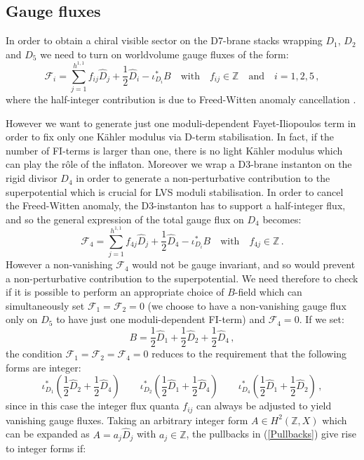 \documentclass[11pt,a4paper]{article}
\newcommand{\be}{\begin{equation}}
\newcommand{\ee}{\end{equation}}
\newcommand{\F}{\mathcal{F}}
\begin{document}
\subsection{Gauge fluxes}

In order to obtain a chiral visible sector on the D7-brane stacks wrapping $D_1$, $D_2$ and $D_5$ we need to turn on worldvolume gauge fluxes of the form:
\be
\F_i = \sum_{j=1}^{h^{1,1}} f_{ij}\hat{D}_j + \frac12 \hat{D}_i - \iota_{D_i}^*B \quad\text{with}\quad f_{ij}\in \mathbb{Z} \quad\text{and}\quad i=1,2,5\,,
\ee
where the half-integer contribution is due to Freed-Witten anomaly cancellation \cite{Minasian:1997mm, Freed:1999vc}. 

However we want to generate just one moduli-dependent Fayet-Iliopoulos term in order to fix only one K\"ahler modulus via D-term stabilisation. In fact, if the number of FI-terms is larger than one, there is no light K\"ahler modulus which can play the r\^ole of the inflaton. Moreover we wrap a D3-brane instanton on the rigid divisor $D_4$ in order to generate a non-perturbative contribution to the superpotential which is crucial for LVS moduli stabilisation. In order to cancel the Freed-Witten anomaly, the D3-instanton has to support a half-integer flux, and so the general expression of the total gauge flux on $D_4$ becomes:
\be
\F_4 = \sum_{j=1}^{h^{1,1}} f_{4j}\hat{D}_j + \frac12 \hat{D}_4 - \iota_{D_i}^*B \quad\text{with}\quad f_{4j}\in \mathbb{Z}\,.
\ee
However a non-vanishing $\F_4$ would not be gauge invariant, and so would prevent a non-perturbative contribution to the superpotential. We need therefore to check if it is possible to perform an appropriate choice of $B$-field which can simultaneously set $\F_1=\F_2=0$ (we choose to have a non-vanishing gauge flux only on $D_5$ to have just one moduli-dependent FI-term) and $\F_4=0$. If we set:
\be
B = \frac12 \hat{D}_1 + \frac12 \hat{D}_2 + \frac12 \hat{D}_4\,,
\label{Bfield}
\ee
the condition $\F_1=\F_2=\F_4=0$ reduces to the requirement that the following forms are integer:
\be
\iota_{D_1}^* \left(\frac12 \hat{D}_2 + \frac12 \hat{D}_4 \right) \qquad 
\iota_{D_2}^* \left(\frac12 \hat{D}_1 + \frac12 \hat{D}_4 \right) \qquad
\iota_{D_4}^* \left(\frac12 \hat{D}_1 + \frac12 \hat{D}_2 \right)\,,
\label{Pullbacks}
\ee
since in this case the integer flux quanta $f_{ij}$ can always be adjusted to yield vanishing gauge fluxes. 
Taking an arbitrary integer form $A\in H^2(\mathbb{Z},X)$ which can be expanded as $A=a_j\hat{D}_j$ with $a_j \in \mathbb{Z}$, the pullbacks in (\ref{Pullbacks}) give rise to integer forms if:
\end{document}
